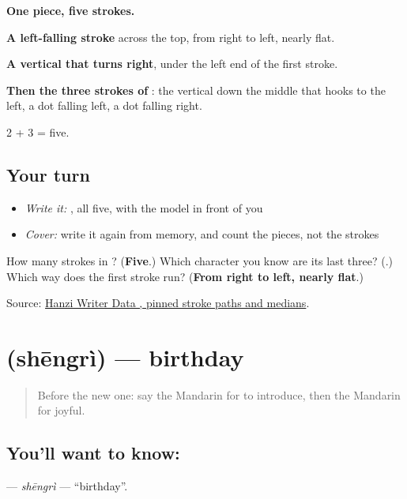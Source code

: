 \begin{quote}
\end{quote}

\textbf{One piece, five strokes.}

\textbf{A left-falling stroke} across the top, from right to left, nearly flat.

\textbf{A vertical that turns right}, under the left end of the first stroke.

\textbf{Then the three strokes of }: the vertical down the middle that hooks to the left, a dot falling left, a dot falling right.

2 + 3 = five.

\subsection*{Your turn}
\begin{itemize}
\raggedright
  \item \emph{Write it:} , all five, with the model in front of you
  \item \emph{Cover:} write it again from memory, and count the pieces, not the strokes
\end{itemize}

\begin{tcolorbox}[breakable,colback=teal!4,colframe=teal!35!black,title={Before you move on}]
How many strokes in ? (\textbf{Five}.) Which character you know are its last three? (\textbf{}.) Which way does the first stroke run? (\textbf{From right to left, nearly flat}.)

Source: \href{https://raw.githubusercontent.com/chanind/hanzi-writer-data/68d10a4b21150cae5e1ebbd223eed289cf32d90c/data/\%E4\%B9\%90.json}{Hanzi Writer Data , pinned stroke paths and medians}.
\end{tcolorbox}
\section[\texorpdfstring{\zh{生日} (shēngrì)}{生日 (shēngrì)}]{ (shēngrì) — birthday}

\label{lesson:ZH-C75-shengri}



\begin{quote}
Before the new one: say the Mandarin for to introduce, then the Mandarin for joyful.
\end{quote}

\subsection*{You'll want to know: }
\textbf{} — \emph{shēngrì} — \textquotedblleft{}birthday\textquotedblright{}.

